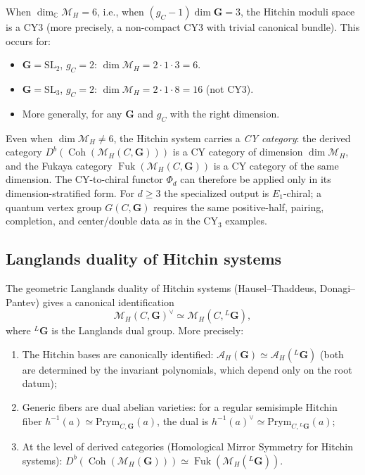 \documentclass[11pt]{article}
\theoremstyle{definition}
\theoremstyle{remark}
\DeclareMathOperator{\Coh}{Coh}
\DeclareMathOperator{\Fuk}{Fuk}
\newcommand{\cA}{\mathcal{A}}
\newcommand{\cM}{\mathcal{M}}
\newcommand{\bC}{\mathbb{C}}
\begin{document}
When $\dim_\bC \cM_H = 6$, i.e., when
$(g_C - 1) \dim \mathbf{G} = 3$, the Hitchin moduli space is a
CY3 (more precisely, a non-compact CY3 with trivial canonical bundle).
This occurs for:
\begin{itemize}
\item $\mathbf{G} = \mathrm{SL}_2$, $g_C = 2$:
$\dim \cM_H = 2 \cdot 1 \cdot 3 = 6$.
\item $\mathbf{G} = \mathrm{SL}_3$, $g_C = 2$:
$\dim \cM_H = 2 \cdot 1 \cdot 8 = 16$ (not CY3).
\item More generally, for any $\mathbf{G}$ and $g_C$ with the right
dimension.
\end{itemize}

Even when $\dim \cM_H \neq 6$, the Hitchin system
carries a \emph{CY category}: the derived category
$D^b(\Coh(\cM_H(C, \mathbf{G})))$ is a CY category of dimension
$\dim \cM_H$, and the Fukaya category $\Fuk(\cM_H(C, \mathbf{G}))$
is a CY category of the same dimension. The CY-to-chiral functor
$\Phi_d$ can therefore be applied only in its dimension-stratified
form. For $d\geq 3$ the specialized output is $E_1$-chiral; a quantum
vertex group $G(C,\mathbf{G})$ requires the same positive-half,
pairing, completion, and center/double data as in the CY$_3$ examples.

\subsection{Langlands duality of Hitchin systems}

The geometric Langlands duality of Hitchin systems (Hausel--Thaddeus,
Donagi--Pantev) gives a canonical identification
\begin{equation}\label{eq:hitchin-langlands}
\cM_H(C, \mathbf{G})^\vee \simeq \cM_H(C, {}^L\mathbf{G}),
\end{equation}
where ${}^L\mathbf{G}$ is the Langlands dual group. More precisely:
\begin{enumerate}[label=(\roman*)]
\item The Hitchin bases are canonically identified:
$\cA_H(\mathbf{G}) \simeq \cA_H({}^L\mathbf{G})$ (both are determined
by the invariant polynomials, which depend only on the root datum);
\item Generic fibers are dual abelian varieties: for a regular
semisimple Hitchin fiber $h^{-1}(a) \simeq \mathrm{Prym}_{C,\mathbf{G}}(a)$,
the dual is $h^{-1}(a)^\vee \simeq \mathrm{Prym}_{C,{}^L\mathbf{G}}(a)$;
\item At the level of derived categories (Homological Mirror Symmetry
for Hitchin systems):
$D^b(\Coh(\cM_H(\mathbf{G}))) \simeq \Fuk(\cM_H({}^L\mathbf{G}))$.
\end{enumerate}
\end{document}
